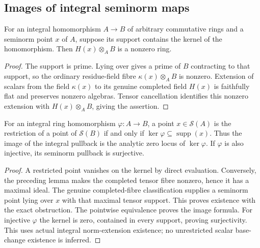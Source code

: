 \subsection{Images of integral seminorm maps}
\label{subsec:integral-spectrum-images}

\begin{lemma}
\label{spectrum:integral-nontrivial-fibre}
\leanok
\leanok
{}
For an integral homomorphism $A\to B$ of arbitrary commutative rings
and a seminorm point $x$ of $A$, suppose its support contains the kernel
of the homomorphism. Then $H(x)\otimes_A B$ is a nonzero ring.
\end{lemma}
\begin{proof}
The support is prime. Lying over gives a prime of $B$ contracting to
that support, so the ordinary residue-field fibre $\kappa(x)\otimes_A B$
is nonzero. Extension of scalars from the field $\kappa(x)$ to its
genuine completed field $H(x)$ is faithfully flat and preserves
nonzero algebras. Tensor cancellation identifies this nonzero extension
with $H(x)\otimes_A B$, giving the assertion.
\end{proof}

\begin{theorem}
\label{spectrum:integral-image}
\leanok
\leanok
{}
For an integral ring homomorphism $\varphi:A\to B$, a point $x\in\mathcal S(A)$
is the restriction of a point of $\mathcal S(B)$ if and only if
$\ker\varphi\subseteq\operatorname{supp}(x)$. Thus the image of
the integral pullback is the analytic zero locus of $\ker\varphi$.
If $\varphi$ is also injective, its seminorm pullback is surjective.
\end{theorem}
\begin{proof}
A restricted point vanishes on the kernel by direct evaluation.
Conversely, the preceding lemma makes the completed tensor fibre
nonzero, hence it has a maximal ideal. The genuine completed-fibre
classification supplies a seminorm point lying over $x$ with that
maximal tensor support. This proves existence with the exact obstruction.
The pointwise equivalence proves the image formula. For injective
$\varphi$ the kernel is zero, contained in every support, proving
surjectivity. This uses actual integral norm-extension existence;
no unrestricted scalar base-change existence is inferred.
\end{proof}


